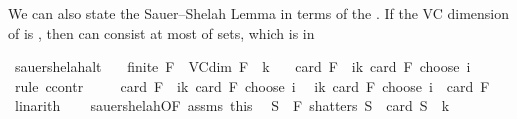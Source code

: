 \begin{isabellebody}
\begin{isamarkuptext}
We can also state the Sauer–Shelah Lemma in terms of the . If the VC dimension of  is , then 
      can consist at most of  sets, which is in %
\end{isamarkuptext}\isamarkuptrue%
\isamarkupfalse%
\ sauer{\isacharunderscore}{\kern0pt}shelah{\isacharunderscore}{\kern0pt}alt{\isacharcolon}{\kern0pt}\isanewline
\ \ \ {\isachardoublequoteopen}finite\ {\isacharparenleft}{\kern0pt}{\isasymUnion}F{\isacharparenright}{\kern0pt}{\isachardoublequoteclose}\ \ {\isachardoublequoteopen}VC{\isacharunderscore}{\kern0pt}dim\ F\ {\isacharequal}{\kern0pt}\ k{\isachardoublequoteclose}\isanewline
\ \ \ {\isachardoublequoteopen}card\ F\ {\isasymle}\ {\isacharparenleft}{\kern0pt}{\isasymSum}i{\isasymle}k{\isachardot}{\kern0pt}\ card\ {\isacharparenleft}{\kern0pt}{\isasymUnion}F{\isacharparenright}{\kern0pt}\ choose\ i{\isacharparenright}{\kern0pt}{\isachardoublequoteclose}\isanewline
%
\isadelimproof
%
\endisadelimproof
%
\isatagproof
{}\isamarkupfalse%
\ {\isacharparenleft}{\kern0pt}rule\ ccontr{\isacharparenright}{\kern0pt}\isanewline
\ \ \isamarkupfalse%
\ {\isachardoublequoteopen}{\isasymnot}\ card\ F\ {\isasymle}\ {\isacharparenleft}{\kern0pt}{\isasymSum}i{\isasymle}k{\isachardot}{\kern0pt}\ card\ {\isacharparenleft}{\kern0pt}{\isasymUnion}F{\isacharparenright}{\kern0pt}\ choose\ i{\isacharparenright}{\kern0pt}{\isachardoublequoteclose}\ \isamarkupfalse%
\ {\isachardoublequoteopen}{\isacharparenleft}{\kern0pt}{\isasymSum}i{\isasymle}k{\isachardot}{\kern0pt}\ card\ {\isacharparenleft}{\kern0pt}{\isasymUnion}F{\isacharparenright}{\kern0pt}\ choose\ i{\isacharparenright}{\kern0pt}\ {\isacharless}{\kern0pt}\ card\ F{\isachardoublequoteclose}\ \isamarkupfalse%
\ linarith\isanewline
\ \ \isamarkupfalse%
\ sauer{\isacharunderscore}{\kern0pt}shelah{\isacharbrackleft}{\kern0pt}OF\ assms{\isacharparenleft}{\kern0pt}{}{\isacharparenright}{\kern0pt}\ this{\isacharbrackright}{\kern0pt}\ \isamarkupfalse%
\ S\ \ {\isachardoublequoteopen}F\ shatters\ S{\isachardoublequoteclose}\ \ {\isachardoublequoteopen}card\ S\ {\isacharequal}{\kern0pt}\ k\ {\isacharplus}{\kern0pt}\ {}{\isachardoublequoteclose}\ \isamarkupfalse%

\end{isabellebody}
